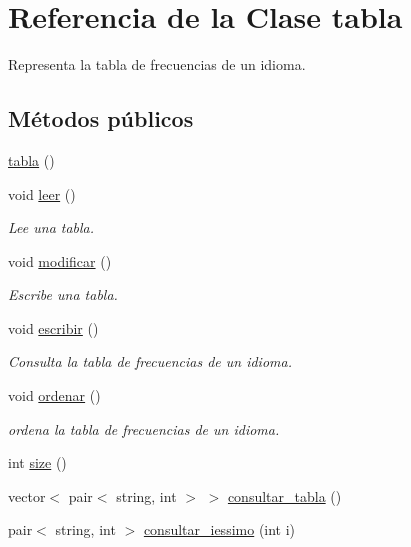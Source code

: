 \hypertarget{classtabla}{}\section{Referencia de la Clase tabla}
\label{classtabla}


Representa la tabla de frecuencias de un idioma.  


\subsection*{Métodos públicos}
\begin{DoxyCompactItemize}
\item 
\hyperlink{classtabla_a47ec7f5106829c96469acb80c4992849}{tabla} ()
\item 
void \hyperlink{classtabla_ab297ddbd500d85a98d7c801697b73721}{leer} ()
\begin{DoxyCompactList}\small\item\em Lee una tabla. \end{DoxyCompactList}\item 
void \hyperlink{classtabla_a37f915651b80eaa0c6dc47c23ff92557}{modificar} ()
\begin{DoxyCompactList}\small\item\em Escribe una tabla. \end{DoxyCompactList}\item 
void \hyperlink{classtabla_ae0d9d7c8c80ef904a0c6cb0d25268b21}{escribir} ()
\begin{DoxyCompactList}\small\item\em Consulta la tabla de frecuencias de un idioma. \end{DoxyCompactList}\item 
void \hyperlink{classtabla_a0c82642a3b06e17e3de850eedbe96d37}{ordenar} ()
\begin{DoxyCompactList}\small\item\em ordena la tabla de frecuencias de un idioma. \end{DoxyCompactList}\item 
int \hyperlink{classtabla_ade5cabea713c5247052a4ea28462945d}{size} ()
\item 
vector$<$ pair$<$ string, int $>$ $>$ \hyperlink{classtabla_a0debfe16db434472d3d1ec409f2ca6b5}{consultar\+\_\+tabla} ()
\item 
pair$<$ string, int $>$ \hyperlink{classtabla_aab5168294f0ecdfe4c3f22761a78d31f}{consultar\+\_\+iessimo} (int i)
\end{DoxyCompactItemize}


